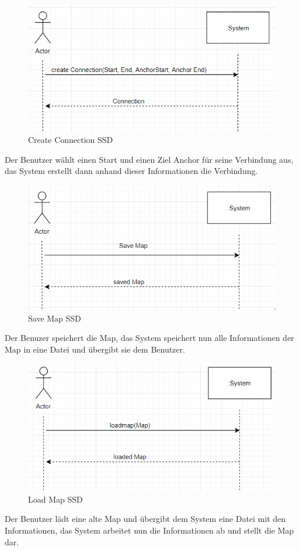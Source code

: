 \begin{figure}[H]
	\centering
		\includegraphics[scale=0.7]{images/createconnection.PNG}
	\caption{Create Connection SSD}
	\label{fig:create_connection_ssd}
\end{figure}
Der Benutzer wählt einen Start und einen Ziel Anchor für seine Verbindung aus, das System erstellt
dann anhand dieser Informationen die Verbindung.

\begin{figure}[H]
	\centering
		\includegraphics[scale=0.7]{images/savemap.PNG}
	\caption{Save Map SSD}
	\label{fig:save_map_ssd}
\end{figure}
Der Benuzer speichert die Map, das System speichert nun alle Informationen der Map in eine
Datei und übergibt sie dem Benutzer.

\begin{figure}[H]
	\centering
		\includegraphics[scale=0.7]{images/loadmap.PNG}
	\caption{Load Map SSD}
	\label{fig:load_map_ssd}
\end{figure}
Der Benutzer lädt eine alte Map und übergibt dem System eine Datei mit den Informationen, das System
arbeitet nun die Informationen ab und stellt die Map dar.

